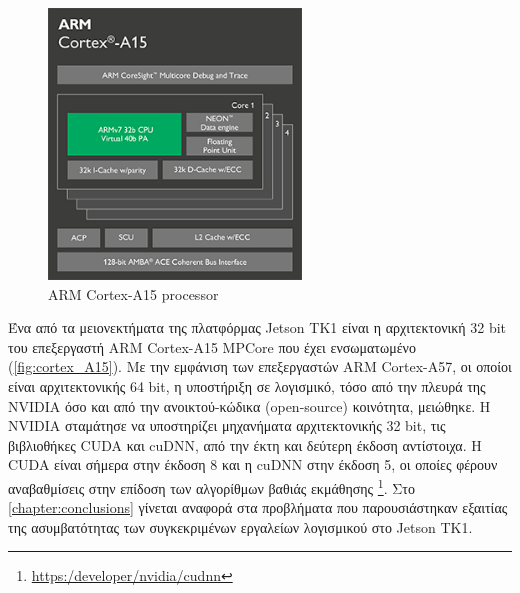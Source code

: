 \begin{figure}[!ht]
  \centering
  \includegraphics[width=0.6\textwidth]{./images/chapter4/cortex_A15_chip_diagram.png}
  \caption[ARM Cortex-A15 processor]{ARM Cortex-A15 processor}
  \label{fig:cortex_A15}
\end{figure}

Ένα από τα μειονεκτήματα της πλατφόρμας Jetson TK1 είναι η αρχιτεκτονική 32 bit του επεξεργαστή ARM Cortex-A15 MPCore
που έχει ενσωματωμένο (\autoref{fig:cortex_A15}). Με την εμφάνιση των επεξεργαστών ARM Cortex-A57,
οι οποίοι είναι αρχιτεκτονικής 64 bit,
η υποστήριξη σε λογισμικό, τόσο από την πλευρά της NVIDIA όσο και από την ανοικτού-κώδικα (open-source) κοινότητα, μειώθηκε.
Η NVIDIA σταμάτησε να υποστηρίζει μηχανήματα αρχιτεκτονικής 32 bit, τις βιβλιοθήκες CUDA και cuDNN,
από την έκτη και δεύτερη έκδοση αντίστοιχα. Η CUDA είναι σήμερα στην έκδοση 8 και η cuDNN στην έκδοση 5,
οι οποίες φέρουν αναβαθμίσεις στην επίδοση των αλγορίθμων βαθιάς εκμάθησης
\footnote{\href{https:/developer/nvidia/cudnn}{https:/developer/nvidia/cudnn}}.
Στο \autoref{chapter:conclusions} γίνεται αναφορά στα προβλήματα που παρουσιάστηκαν
εξαιτίας της ασυμβατότητας των συγκεκριμένων εργαλείων λογισμικού στο Jetson TK1.

